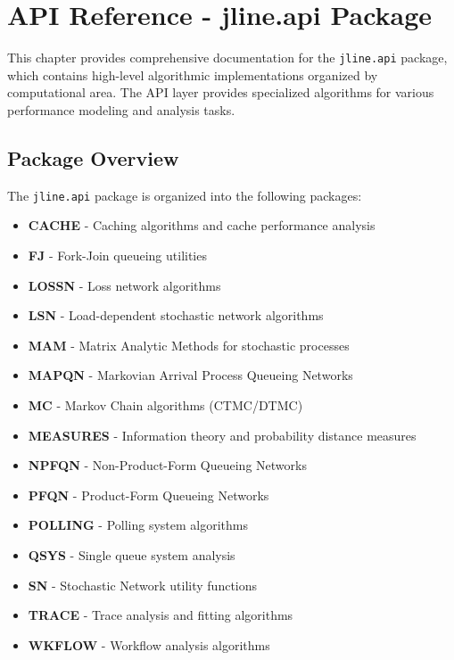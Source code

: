 \chapter{API Reference - jline.api Package}
\label{ch:api-reference}

This chapter provides comprehensive documentation for the \texttt{jline.api} package, which contains high-level algorithmic implementations organized by computational area. The API layer provides specialized algorithms for various performance modeling and analysis tasks.

\section{Package Overview}

The \texttt{jline.api} package is organized into the following packages:

\begin{itemize}
\item \textbf{CACHE} - Caching algorithms and cache performance analysis
\item \textbf{FJ} - Fork-Join queueing utilities
\item \textbf{LOSSN} - Loss network algorithms
\item \textbf{LSN} - Load-dependent stochastic network algorithms
\item \textbf{MAM} - Matrix Analytic Methods for stochastic processes
\item \textbf{MAPQN} - Markovian Arrival Process Queueing Networks
\item \textbf{MC} - Markov Chain algorithms (CTMC/DTMC)
\item \textbf{MEASURES} - Information theory and probability distance measures
\item \textbf{NPFQN} - Non-Product-Form Queueing Networks
\item \textbf{PFQN} - Product-Form Queueing Networks
\item \textbf{POLLING} - Polling system algorithms
\item \textbf{QSYS} - Single queue system analysis
\item \textbf{SN} - Stochastic Network utility functions
\item \textbf{TRACE} - Trace analysis and fitting algorithms
\item \textbf{WKFLOW} - Workflow analysis algorithms
\end{itemize}

